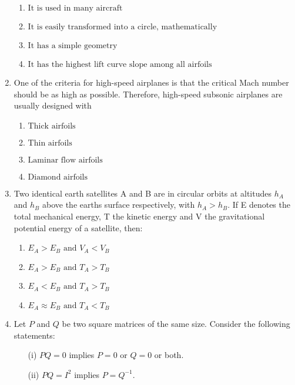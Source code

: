 \documentclass[journal]{IEEEtran}
\numberwithin{equation}{enumi}
\numberwithin{figure}{enumi}
\begin{document}
\begin{enumerate}
    \begin{enumerate}
        \item $ \text{It is used in many aircraft} $
        \item $ \text{It is easily transformed into a circle, mathematically} $
        \item $ \text{It has a simple geometry} $
        \item $ \text{It has the highest lift curve slope among all airfoils} $
    \end{enumerate}
\bigskip
\item One of the criteria for high-speed airplanes is that the critical Mach number should be as high as possible. Therefore, high-speed subsonic airplanes are usually designed with
\begin{multicols}{2}
    \begin{enumerate}
        \item $ \text{Thick airfoils} $
        \item $ \text{Thin airfoils} $
        \item $ \text{Laminar flow airfoils} $
        \item $ \text{Diamond airfoils} $
    \end{enumerate}
\end{multicols}
\bigskip
\item Two identical earth satellites A and B are in circular orbits at altitudes $h_A$ and $h_B$ above the earths surface respectively, with $h_A > h_B$. If E denotes the total mechanical energy, T the kinetic energy and V the gravitational potential energy of a satellite, then:
\begin{multicols}{2}
    \begin{enumerate}
        \item $ E_A > E_B \text{ and } V_A < V_B $
        \item $ E_A > E_B \text{ and } T_A > T_B $
        \item $ E_A < E_B \text{ and } T_A > T_B $
        \item $ E_A \approx E_B \text{ and } T_A < T_B $
    \end{enumerate}
\end{multicols}
\bigskip
\item Let $P$ and $Q$ be two square matrices of the same size. Consider the following statements:
\begin{enumerate}
    \item[(i)] $PQ = 0$ implies $P = 0$ or $Q = 0$ or both.
    \item[(ii)] $PQ = I^2$ implies $P = Q^{-1}$.

\end{enumerate}
\end{enumerate}
\end{document}
